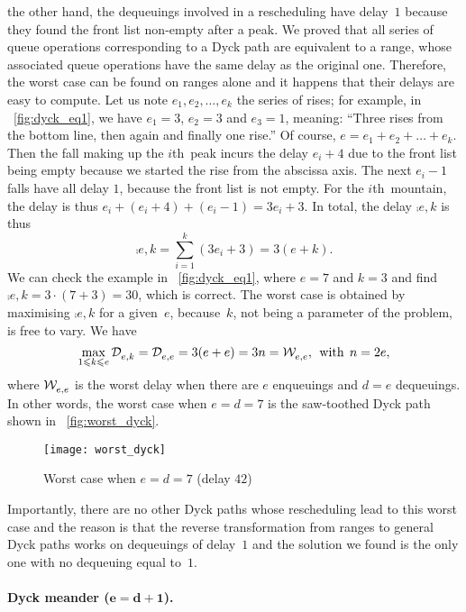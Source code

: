 the other hand, the dequeuings involved in a rescheduling have
delay~\(1\) because they found the front list non\hyp{}empty after a
peak. We proved that all series of queue operations corresponding to a
Dyck path are equivalent to a range, whose associated queue operations
have the same delay as the original one. Therefore, the worst case can
be found on ranges alone and it happens that their delays are easy to
compute. Let us note \(e_1, e_2, \dots, e_k\) the series of rises; for
example, in \fig~\vref{fig:dyck_eq1}, we have \({e_1=3}\), \({e_2=3}\)
and \({e_3=1}\), meaning: ``Three rises from the bottom line, then
again and finally one rise.'' Of course, \(e=e_1 + e_2 + \dots +
e_k\). Then the fall making up the \(i\)th~peak incurs the delay
\(e_i+4\) due to the front list being empty because we started the
rise from the abscissa axis. The next \(e_i-1\) falls have all delay
\(1\), because the front list is not empty. For the \(i\)th~mountain,
the delay is thus \(e_i+(e_i+4)+(e_i-1) = 3e_i+3\). In total, the
delay \(\comp{}{e,k}\) is thus
\[
\comp{}{e,k} = \sum_{i=1}^{k}{(3e_i+3)} = 3(e+k).
\]
We can check the example in \fig~\vref{fig:dyck_eq1}, where \({e=7}\)
and \({k=3}\) and find \(\comp{}{e,k}=3\cdot(7+3)=30\), which is
correct. The worst case is obtained by maximising \(\comp{}{e,k}\) for
a given~\(e\), because~\(k\), not being a parameter of the problem, is
free to vary. We have
\[
\max_{1 \leqslant k \leqslant e}{\mathcal{D}_{e,k}^{\texttt{}}}
  = \mathcal{D}_{e,e}^{\texttt{}}
  = 3(e+e) = 3n = \mathcal{W}_{e,e}^{\texttt{}},\,\; \text{with} \,\; n=2e,
\]
where \(\mathcal{W}_{e,e}^{\texttt{}}\) is the worst delay when there are \(e\)
enqueuings and \({d=e}\) dequeuings. In other words, the worst case
when \(e=d=7\) is the saw\hyp{}toothed Dyck path shown in
\fig~\vref{fig:worst_dyck}.
\begin{figure}[t]
\centering
\texttt{[image: worst\_dyck]}
\caption{Worst case when \(e=d=7\) (delay \(42\))
\label{fig:worst_dyck}}
\end{figure}
Importantly, there are no other Dyck paths whose rescheduling lead to
this worst case and the reason is that the reverse transformation from
ranges to general Dyck paths works on dequeuings of delay~\(1\) and
the solution we found is the only one with no dequeuing equal
to~\(1\).

\medskip

\paragraph{Dyck meander (\(\boldsymbol{e=d+1}\)).}


